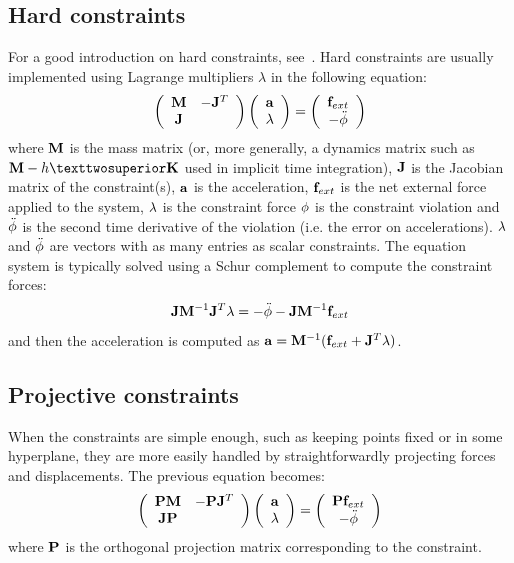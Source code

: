 \subsection{Hard constraints}
For a good introduction on hard constraints, see~\cite{witkinconstraints}.
Hard constraints are usually implemented using Lagrange multipliers $\lambda$ in the following equation:
\begin{equation} \label{eq acc hard}
\left( \begin{array}{cc}
\M & -\Jt \\
 \J &  \end{array}\right)
\left( \begin{array}{c}
\acc \\ \lam
\end{array}\right) = \left( \begin{array}{c}
\forcext  \\
-\ddot \violation
\end{array}\right) 
\end{equation}
where $\M$ is the mass matrix (or, more generally, a dynamics matrix such as $\M-h²\K$ used in implicit time integration), $\J$ is the Jacobian matrix of the constraint(s), $\acc$ is the acceleration, $\forcext$ is the net external force applied to the system, $\lam$ is the constraint force $\violation$ is the constraint violation and $\ddot \violation$ is the second time derivative of the violation (i.e. the error on accelerations).
$\lam$ and $\ddot \violation$ are vectors with as many entries as scalar constraints. The equation system is typically solved using a Schur complement to compute the constraint forces:
\begin{equation}\label{eq schur rigid}
\J \Minv \Jt \lam = -\ddot \violation - \J \Minv \forcext
\end{equation}
and then the acceleration is computed as $\acc = \Minv( \forcext + \Jt \lam)$.

\subsection{Projective constraints}
When the constraints are simple enough, such as keeping points fixed or in some hyperplane, they are more easily handled by straightforwardly projecting forces and displacements.
The previous equation becomes:
\begin{equation} \label{eq acc hard projected}
\left( \begin{array}{cc}
\P\M & -\P\Jt \\
 \J\P &  \end{array}\right)
\left( \begin{array}{c}
\acc \\ \lam
\end{array}\right) = \left( \begin{array}{c}
\P\forcext  \\
-\ddot \violation
\end{array}\right) 
\end{equation}
 where $\P$ is the orthogonal projection matrix corresponding to the constraint.

